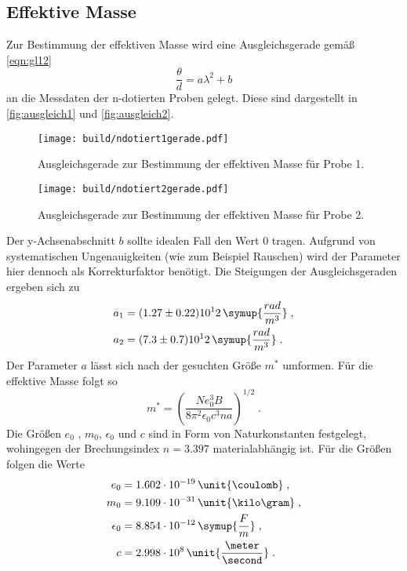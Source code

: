 \subsection{Effektive Masse}
Zur Bestimmung der effektiven Masse wird eine Ausgleichsgerade gemäß \autoref{eqn:gl12}
\begin{equation*}
    \frac{\theta}{d}=a\lambda ^2 +b
\end{equation*} 
an die Messdaten der n-dotierten Proben gelegt. Diese sind dargestellt in \autoref{fig:ausgleich1} und \autoref{fig:ausgleich2}.
\begin{figure}[H]
    \centering
    \texttt{[image: build/ndotiert1gerade.pdf]}
    \caption{Ausgleichsgerade zur Bestimmung der effektiven Masse für Probe 1.}
    \label{fig:ausgleich1}
\end{figure}
\begin{figure}[H]
    \centering
    \texttt{[image: build/ndotiert2gerade.pdf]}
    \caption{Ausgleichsgerade zur Bestimmung der effektiven Masse für Probe 2.}
    \label{fig:ausgleich2}
\end{figure}
Der y-Achsenabschnitt $b$ sollte idealen Fall den Wert 0 tragen. Aufgrund von systematischen Ungenauigkeiten (wie zum Beispiel Rauschen) wird der Parameter hier dennoch als Korrekturfaktor benötigt. Die Steigungen der Ausgleichsgeraden ergeben sich zu 
\begin{align*}
    a_1 &= (1.27 \pm 0.22)10^12 \,\symup{\frac{rad}{m^3}} \; ,\\
    a_2 &= (7.3 \pm 0.7)10^12 \,\symup{\frac{rad}{m^3}}\; .
\end{align*}
Der Parameter $a$ lässt sich nach der gesuchten Größe $m^*$ umformen. Für die effektive Masse folgt so
\begin{equation}
    m^*=\left(\frac{Ne_0^3 B}{8\pi^2 \epsilon_0 c^3 na}\right)^{1/2}\; .
    \label{eqn:effMasse}
\end{equation}
Die Größen $e_0$ , $m_0$, $\epsilon_0$ und $c$ sind in Form von Naturkonstanten festgelegt, wohingegen der Brechungsindex $n=3.397$\cite{GaAs} materialabhängig ist.
Für die Größen folgen die Werte 
\begin{align*}
    e_0&= 1.602 \cdot 10^{-19} \, \unit{\coulomb}\; ,\\
    m_0&= 9.109 \cdot 10^{-31}\, \unit{\kilo \gram}\; ,\\
    \epsilon_0 &= 8.854 \cdot 10^{-12}\,\symup{\frac{F}{m}} \;,\\
    c&= 2.998 \cdot 10^8\, \unit{\frac{\meter}{\second}}\; .
\end{align*}
